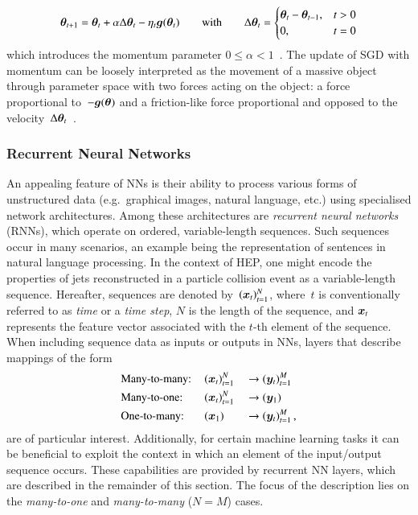 \begin{align*}
  \bm{\theta}_{t + 1} = \bm{\theta}_{t}
  + \alpha \Delta\bm{\theta}_{t} - \eta_t \bm{g}(\bm{\theta}_{t})
  \qquad \text{with} \qquad
  \Delta\bm{\theta}_{t} =
  \begin{cases}
    \bm{\theta}_{t} - \bm{\theta}_{t - 1}, & t > 0 \\
    0,                                         & t = 0
  \end{cases}
\end{align*}
which introduces the momentum parameter
$0 \leq \alpha < 1$~\cite{rumelhart1986learning,Goodfellow-et-al-2016}. The
update of SGD with momentum can be loosely interpreted as the movement of a
massive object through parameter space with two forces acting on the object: a
force proportional to~$-\bm{g}(\bm{\theta})$ and a friction-like force
proportional and opposed to the
velocity~$\Delta\bm{\theta}_{t}$~\cite{Goodfellow-et-al-2016}.


\subsubsection{Recurrent Neural Networks}%
\label{sec:rnn}

An appealing feature of NNs is their ability to process various forms of
unstructured data (e.g.~graphical images, natural language, etc.) using
specialised network architectures. Among these architectures are \emph{recurrent
  neural networks} (RNNs), which operate on ordered, variable-length
sequences. Such sequences occur in many scenarios, an example being the
representation of sentences in natural language processing. In the context of
HEP, one might encode the properties of jets reconstructed in a particle
collision event as a variable-length sequence. Hereafter, sequences are denoted
by~$(\bm{x}_{t})_{t = 1}^{N}$, where~$t$ is conventionally referred to as
\emph{time} or a \emph{time step}, $N$ is the length of the sequence, and
$\bm{x}_{t}$ represents the feature vector associated with the $t$-th element
of the sequence. When including sequence data as inputs or outputs in NNs,
layers that describe mappings of the form
\begin{alignat*}{3}
  &\text{Many-to-many:}\,
  &&(\bm{x}_{t})_{t = 1}^{N} &&\rightarrow (\bm{y}_{t})_{t = 1}^{M} \\
  &\text{Many-to-one:}\,
  &&(\bm{x}_{t})_{t = 1}^{N} &&\rightarrow (\bm{y}_{1}) \\
  &\text{One-to-many:}\,
  &&(\bm{x}_1)              &&\rightarrow (\bm{y}_{t})_{t = 1}^{M} \,\text{,}
\end{alignat*}
are of particular interest. Additionally, for certain machine learning tasks it
can be beneficial to exploit the context in which an element of the input/output
sequence occurs. These capabilities are provided by recurrent NN layers, which
are described in the remainder of this section. The focus of the description
lies on the \emph{many-to-one} and \emph{many-to-many} ($N = M$) cases.

